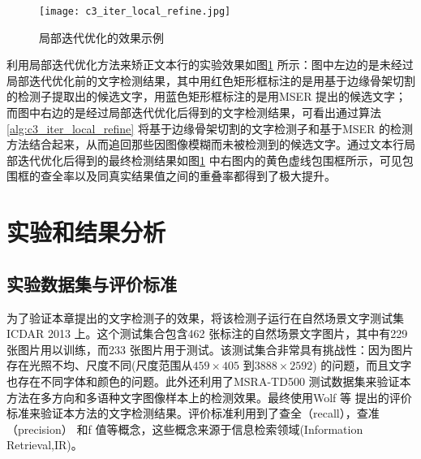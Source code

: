     \begin{figure}[!h]
    \centering
    \texttt{[image: c3\_iter\_local\_refine.jpg]} \caption{局部迭代优化的效果示例}
    \label{fig.c3_iter_local_refine}
    \end{figure}

    利用局部迭代优化方法来矫正文本行的实验效果如图\ref{fig.c3_iter_local_refine} 所示：图中左边的是未经过局部迭代优化前的文字检测结果，其中用红色矩形框标注的是用基于边缘骨架切割的检测子提取出的候选文字，用蓝色矩形框标注的是用MSER 提出的候选文字；而图中右边的是经过局部迭代优化后得到的文字检测结果，可看出通过算法\ref{alg:c3_iter_local_refine} 将基于边缘骨架切割的文字检测子和基于MSER 的检测方法结合起来，从而追回那些因图像模糊而未被检测到的候选文字。通过文本行局部迭代优化后得到的最终检测结果如图\ref{fig.c3_iter_local_refine} 中右图内的黄色虚线包围框所示，可见包围框的查全率以及同真实结果值之间的重叠率都得到了极大提升。

    \section{实验和结果分析}

        \subsection{实验数据集与评价标准}

        为了验证本章提出的文字检测子的效果，将该检测子运行在自然场景文字测试集ICDAR 2013 上。这个测试集合包含462 张标注的自然场景文字图片，其中有229 张图片用以训练，而233 张图片用于测试。该测试集合非常具有挑战性：因为图片存在光照不均、尺度不同(尺度范围从$459 \times 405$ 到$3888 \times 2592$) 的问题，而且文字也存在不同字体和颜色的问题。此外还利用了MSRA-TD500 测试数据集来验证本方法在多方向和多语种文字图像样本上的检测效果。最终使用Wolf 等\cite{Wolf2006Object} 提出的评价标准来验证本方法的文字检测结果。评价标准利用到了查全（recall），查准（precision） 和f 值等概念，这些概念来源于信息检索领域(Information Retrieval,IR)。

